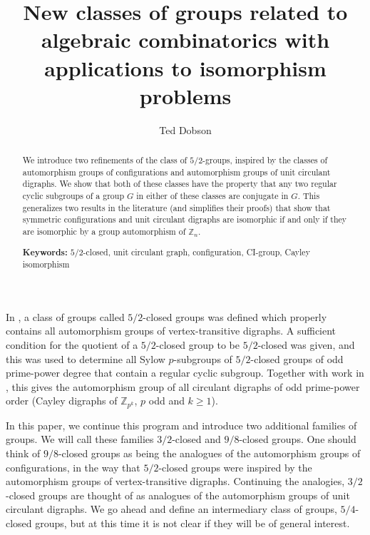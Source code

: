 \documentclass{amsart}
\theoremstyle{definition}
\theoremstyle{remark}
\numberwithin{equation}{section}
\def\Z{{\mathbb Z}}
\begin{document}
\title[]{New classes of groups related to algebraic combinatorics with applications to isomorphism problems}


\author{Ted Dobson}
\address{University of Primorska, UP IAM, Muzejski trg 2, SI-6000 Koper, Slovenia and
\\University of Primorska, UP FAMNIT, Glagolja\v{s}ka 8, SI-6000 Koper, Slovenia}

\begin{abstract}
\smallskip
We introduce two refinements of the class of $5/2$-groups, inspired by the classes of automorphism groups of configurations and automorphism groups of unit circulant digraphs.  We show that both of these classes have the property that any two regular cyclic subgroups of a group $G$ in either of these classes are conjugate in $G$.  This generalizes two results in the literature (and simplifies their proofs) that show that symmetric configurations and unit circulant digraphs are isomorphic if and only if they are isomorphic by a group automorphism of $\Z_n$.

\noindent\textbf{Keywords:} $5/2$-closed, unit circulant graph, configuration, CI-group, Cayley isomorphism
\end{abstract}

\maketitle

In \cite{Dobson2023apreprint}, a class of groups called $5/2$-closed groups was defined which properly contains all automorphism groups of vertex-transitive digraphs.  A sufficient condition for the quotient of a $5/2$-closed group to be $5/2$-closed was given, and this was used to determine all Sylow $p$-subgroups of $5/2$-closed groups of odd prime-power degree that contain a regular cyclic subgroup.  Together with work in \cite{Dobson2023epreprint}, this gives the automorphism group of all circulant digraphs of odd prime-power order (Cayley digraphs of $\Z_{p^k}$, $p$ odd and $k\ge 1$).

In this paper, we continue this program and introduce two additional families of groups.  We will call these families $3/2$-closed and $9/8$-closed groups.  One should think of $9/8$-closed groups as being the analogues of the automorphism groups of configurations, in the way that $5/2$-closed groups were inspired by the automorphism groups of vertex-transitive digraphs.  Continuing the analogies, $3/2$-closed groups are thought of as analogues of the automorphism groups of unit circulant digraphs.  We go ahead and define an intermediary class of groups, $5/4$-closed groups, but at this time it is not clear if they will be of general interest.
\end{document}
